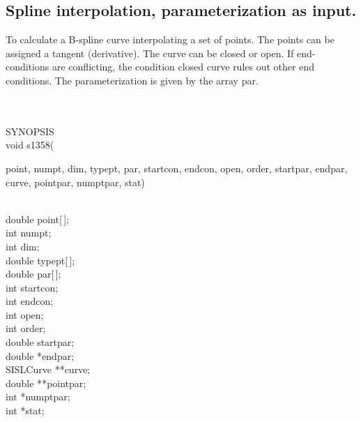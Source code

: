 \subsection{Spline interpolation, parameterization as input.}
\begin{minipg1}
To calculate a B-spline curve interpolating a set of points. The
points can be assigned a tangent (derivative). The curve can be
closed or open. If end-conditions are conflicting, the condition
closed curve rules out other end conditions. The parameterization
is given by the array par.
\end{minipg1} \\ \\
SYNOPSIS\\
        \>void s1358(\begin{minipg3}
        {\fov point}, {\fov numpt}, {\fov dim}, {\fov typept}, {\fov par}, {\fov startcon}, {\fov endcon}, {\fov open},
        {\fov order}, {\fov startpar}, {\fov endpar}, {\fov curve}, {\fov pointpar}, {\fov numptpar}, {\fov stat})
                \end{minipg3}\\[0.3ex]
                \>\>    double  \>      {\fov point}[\,];\\
                \>\>    int     \>      {\fov numpt};\\
                \>\>    int     \>      {\fov dim};\\
                \>\>    double  \>      {\fov typept}[\,];\\
                \>\>    double  \>      {\fov par}[\,];\\
                \>\>    int     \>      {\fov startcon};\\
                \>\>    int     \>      {\fov endcon};\\
                \>\>    int     \>      {\fov open};\\
                \>\>    int     \>      {\fov order};\\
                \>\>    double  \>      {\fov startpar};\\
                \>\>    double  \>      *{\fov endpar};\\
                \>\>    SISLCurve       \>      **{\fov curve};\\
                \>\>    double  \>      **{\fov pointpar};\\
                \>\>    int     \>      *{\fov numptpar};\\
                \>\>    int     \>      *{\fov stat};\\
